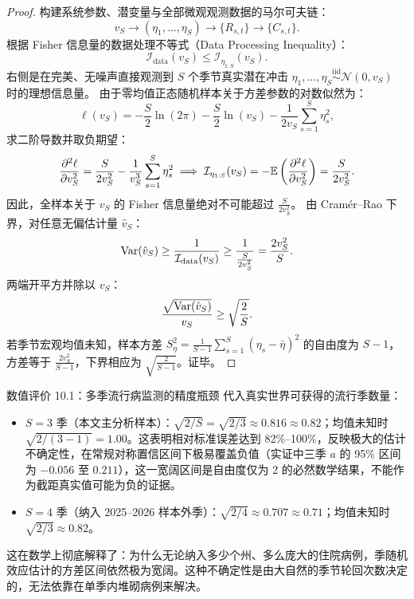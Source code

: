 \begin{proof}
构建系统参数、潜变量与全部微观观测数据的马尔可夫链：
\begin{equation}
  v_S \longrightarrow (\eta_1, \dots, \eta_S) \longrightarrow \{R_{s,t}\} \longrightarrow \{C_{s,t}\}.
\end{equation}
根据 Fisher 信息量的数据处理不等式（Data Processing Inequality）：
\begin{equation}
  \mathcal{I}_{\text{data}}(v_S) \le \mathcal{I}_{\eta_{1:S}}(v_S).
\end{equation}
右侧是在完美、无噪声直接观测到 $S$ 个季节真实潜在冲击 $\eta_1, \dots, \eta_S \overset{\text{iid}}{\sim} \mathcal{N}(0, v_S)$ 时的理想信息量。
由于零均值正态随机样本关于方差参数的对数似然为：
\begin{equation}
  \ell(v_S) = -\frac{S}{2}\ln(2\pi) - \frac{S}{2}\ln(v_S) - \frac{1}{2v_S}\sum_{s=1}^S \eta_s^2,
\end{equation}
求二阶导数并取负期望：
\begin{equation}
  \frac{\partial^2 \ell}{\partial v_S^2} = \frac{S}{2 v_S^2} - \frac{1}{v_S^3}\sum_{s=1}^S \eta_s^2 \implies \mathcal{I}_{\eta_{1:S}}(v_S) = -\mathbb{E}\left( \frac{\partial^2 \ell}{\partial v_S^2} \right) = \frac{S}{2 v_S^2}.
\end{equation}
因此，全样本关于 $v_S$ 的 Fisher 信息量绝对不可能超过 $\frac{S}{2 v_S^2}$。
由 Cramér--Rao 下界，对任意无偏估计量 $\hat{v}_S$：
\begin{equation}
  \mathrm{Var}(\hat{v}_S) \ge \frac{1}{\mathcal{I}_{\text{data}}(v_S)} \ge \frac{1}{\frac{S}{2 v_S^2}} = \frac{2 v_S^2}{S}.
\end{equation}
两端开平方并除以 $v_S$：
\begin{equation}
  \frac{\sqrt{\mathrm{Var}(\hat{v}_S)}}{v_S} \ge \sqrt{\frac{2}{S}}.
\end{equation}
若季节宏观均值未知，样本方差 $S_\eta^2 = \frac{1}{S-1}\sum_{s=1}^S (\eta_s - \bar{\eta})^2$ 的自由度为 $S-1$，方差等于 $\frac{2 v_S^2}{S-1}$，下界相应为 $\sqrt{\frac{2}{S-1}}$。证毕。
\end{proof}

\begin{derivationbox}{数值评价 10.1：多季流行病监测的精度瓶颈}
代入真实世界可获得的流行季数量：
\begin{itemize}
  \item $S = 3$ 季（本文主分析样本）：$\sqrt{2/S} = \sqrt{2/3} \approx 0.816 \approx 0.82$；均值未知时 $\sqrt{2/(3-1)} = 1.00$。这表明相对标准误差达到 82\%--100\%，反映极大的估计不确定性，在常规对称置信区间下极易覆盖负值（实证中三季 $a$ 的 95\% 区间为 $-0.056$ 至 $0.211$），这一宽阔区间是自由度仅为 2 的必然数学结果，不能作为截距真实值可能为负的证据。
  \item $S = 4$ 季（纳入 2025--2026 样本外季）：$\sqrt{2/4} \approx 0.707 \approx 0.71$；均值未知时 $\sqrt{2/3} \approx 0.82$。
\end{itemize}
这在数学上彻底解释了：为什么无论纳入多少个州、多么庞大的住院病例，季随机效应估计的方差区间依然极为宽阔。这种不确定性是由大自然的季节轮回次数决定的，无法依靠在单季内堆砌病例来解决。
\end{derivationbox}
